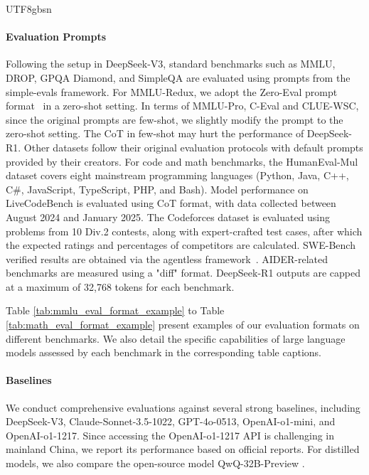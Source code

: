 \documentclass[11pt, a4paper, logo, copyright, nonumbering]{deepseek}
\newcommand{\dsri}{DeepSeek-R1}
\begin{document}
\begin{CJK*}{UTF8}{gbsn}
\paragraph{Evaluation Prompts} Following the setup in DeepSeek-V3, standard benchmarks such as MMLU, DROP, GPQA Diamond, and SimpleQA are evaluated using prompts from the simple-evals framework. For MMLU-Redux, we adopt the Zero-Eval prompt format~\citep{Lin_ZeroEval_A_Unified_2024} in a zero-shot setting. In terms of MMLU-Pro, C-Eval and CLUE-WSC, since the original prompts are few-shot, we slightly modify the prompt to the zero-shot setting. The CoT in few-shot may hurt the performance of  \dsri{}. 
Other datasets follow their original evaluation protocols with default prompts provided by their creators. 
For code and math benchmarks, the HumanEval-Mul dataset covers eight mainstream programming languages (Python, Java, C++, C\#, JavaScript, TypeScript, PHP, and Bash). 
Model performance on LiveCodeBench is evaluated using  CoT format, with data collected between August 2024 and January 2025. The Codeforces dataset is evaluated using problems from 10 Div.2 contests, along with expert-crafted test cases, after which the expected ratings and percentages of competitors are calculated. SWE-Bench verified results are obtained via the agentless framework~\citep{agentless}. AIDER-related benchmarks are measured using a "diff" format.
\dsri{} outputs are capped at a maximum of 32,768 tokens for each benchmark.

Table \ref{tab:mmlu_eval_format_example} to Table \ref{tab:math_eval_format_example} present examples of our evaluation formats on different benchmarks.  We also detail the specific capabilities of large language models assessed by each benchmark in the corresponding table captions.

\paragraph{Baselines} We conduct comprehensive evaluations against several strong baselines, including DeepSeek-V3, Claude-Sonnet-3.5-1022, GPT-4o-0513, OpenAI-o1-mini, and OpenAI-o1-1217. Since accessing the OpenAI-o1-1217 API is challenging in mainland China, we report its performance based on official reports.
For distilled models, we also compare the open-source model QwQ-32B-Preview \citep{QwQ}.


\end{CJK*}
\end{document}
